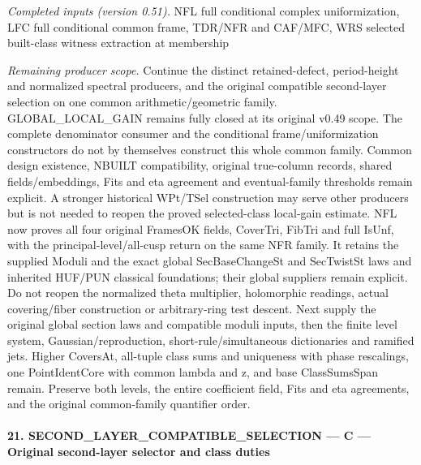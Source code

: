 \documentclass[11pt,a4paper]{article}
\numberwithin{equation}{section}
\theoremstyle{remark}\newtheorem{remark}[theorem]{Remark}
\begin{document}
\emph{Completed inputs (version 0.51).} NFL full conditional complex uniformization, LFC full conditional common frame, TDR/NFR and CAF/MFC, WRS selected built-class witness extraction at membership

\emph{Remaining producer scope.} Continue the distinct retained-defect, period-height and normalized spectral producers, and the original compatible second-layer selection on one common arithmetic/geometric family. GLOBAL\_\allowbreak LOCAL\_\allowbreak GAIN remains fully closed at its original v0.49 scope. The complete denominator consumer and the conditional frame/uniformization constructors do not by themselves construct this whole common family. Common design existence, NBUILT compatibility, original true-column records, shared fields/embeddings, Fits and eta agreement and eventual-family thresholds remain explicit. A stronger historical WPt/TSel construction may serve other producers but is not needed to reopen the proved selected-class local-gain estimate. NFL now proves all four original FramesOK fields, CoverTri, FibTri and full IsUnf, with the principal-level/all-cusp return on the same NFR family. It retains the supplied Moduli and the exact global SecBaseChangeSt and SecTwistSt laws and inherited HUF/PUN classical foundations; their global suppliers remain explicit. Do not reopen the normalized theta multiplier, holomorphic readings, actual covering/fiber construction or arbitrary-ring test descent. Next supply the original global section laws and compatible moduli inputs, then the finite level system, Gaussian/reproduction, short-rule/simultaneous dictionaries and ramified jets. Higher CoversAt, all-tuple class sums and uniqueness with phase rescalings, one PointIdentCore with common lambda and z, and base ClassSumsSpan remain. Preserve both levels, the entire coefficient field, Fits and eta agreements, and the original common-family quantifier order.



\paragraph{21. SECOND\_\allowbreak LAYER\_\allowbreak COMPATIBLE\_\allowbreak SELECTION — C — Original second-layer selector and class duties}
\end{document}
